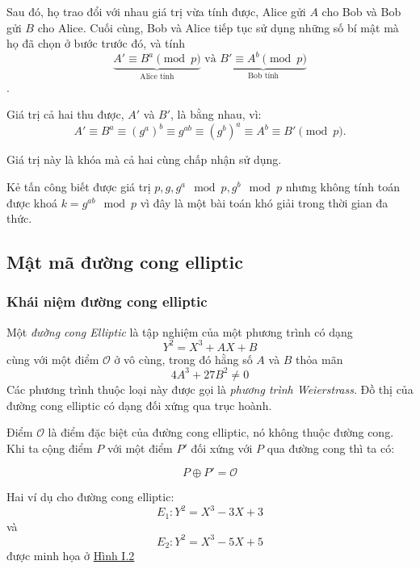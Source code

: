 Sau đó, họ trao đổi với nhau giá trị vừa tính được, Alice gửi $A$ cho Bob và Bob gửi $B$ cho Alice. 
Cuối cùng, Bob và Alice tiếp tục sử dụng những số bí mật mà họ đã chọn ở bước trước đó, và tính
$$\underbrace{A' \equiv B^a \pmod{p}}_{\text{Alice tính}} \text{ và } \underbrace{B' \equiv A^b \pmod{p}}_{\text{Bob tính}}$$.

Giá trị cả hai thu được, $A'$ và $B'$, là bằng nhau, vì:
$$A' \equiv B^a \equiv (g^a)^b \equiv g^{ab} \equiv (g^b)^a \equiv A^b \equiv B' \pmod{p}.$$

Giá trị này là khóa mà cả hai cùng chấp nhận sử dụng.

Kẻ tấn công biết được giá trị $p,g,g^a \mod p, g^b \mod p $ nhưng không 
tính toán được khoá $k = g^{ab} \mod p$ vì đây là một bài toán khó giải 
trong thời gian đa thức. 

\subsection{Mật mã đường cong elliptic}
\subsubsection{Khái niệm đường cong elliptic}

Một \textit{đường cong Elliptic} là tập nghiệm của một phương trình có dạng
$$Y^2 = X^3 + AX + B$$ cùng với một điểm $\mathcal{O}$ ở vô cùng, trong đó hằng số $A$ và $B$ thỏa mãn
$$ 4A^3 + 27B^2 \neq 0$$
Các phương trình thuộc loại này được gọi là \textit{phương trình Weierstrass}. 
Đồ thị của đường cong elliptic có dạng đối xứng qua trục hoành.

Điểm $\mathcal{O}$ là điểm đặc biệt của đường cong elliptic, nó không thuộc đường cong.
Khi ta cộng điểm $P$ với một điểm $P'$ đối xứng với $P$ qua đường cong thì ta có:

$$ P \oplus P' = \mathcal{O}$$

Hai ví dụ cho đường cong elliptic:
$$ E_1: Y^2=X^3-3X+3 $$ và $$ E_2: Y^2=X^3-5X+5 $$ được minh họa ở \hyperref[fg:fg1]{Hình I.2}

